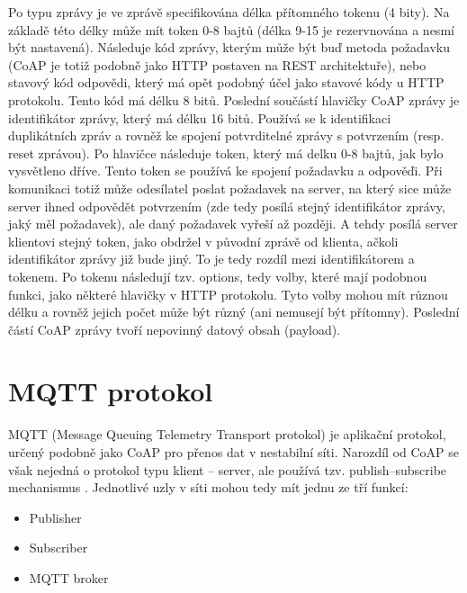 Po typu zprávy je ve zprávě specifikována délka přítomného tokenu (4 bity). Na základě této délky může mít token 0-8 bajtů (délka 9-15 je rezervnována a nesmí být nastavená). Následuje kód zprávy, kterým může být buď metoda požadavku (CoAP je totiž podobně jako HTTP postaven na REST \cite{CoAPCongestionControl2} architektuře), nebo stavový kód odpovědi, který má opět podobný účel jako stavové kódy u HTTP protokolu. Tento kód má délku 8 bitů. Poslední součástí hlavičky CoAP zprávy je identifikátor zprávy, který má délku 16 bitů. Používá se k identifikaci duplikátních zpráv a rovněž ke spojení potvrditelné zprávy s potvrzením (resp. reset zprávou). 
Po hlavičce následuje token, který má delku 0-8 bajtů, jak bylo vysvětleno dříve. Tento token se používá ke spojení požadavku a odpověďi. Při komunikaci totiž může odesílatel poslat požadavek na server, na který sice může server ihned odpovědět potvrzením (zde tedy posílá stejný identifikátor zprávy, jaký měl požadavek), ale daný požadavek vyřeší až později. A tehdy posílá server klientovi stejný token, jako obdržel v původní zprávě od klienta, ačkoli identifikátor zprávy již bude jiný. To je tedy rozdíl mezi identifikátorem a tokenem.
Po tokenu následují tzv. options, tedy volby, které mají podobnou funkci, jako některé hlavičky v HTTP protokolu. Tyto volby mohou mít různou délku a rovněž jejich počet může být různý (ani nemusejí být přítomny).
Poslední částí CoAP zprávy tvoří nepovinný datový obsah (payload).

\section{MQTT protokol}
MQTT (Message Queuing Telemetry Transport protokol) je aplikační protokol, určený podobně jako CoAP pro přenos dat v nestabilní síti. Narozdíl od CoAP se však nejedná o protokol typu klient -- server, ale používá tzv. publish--subscribe mechanismus \cite{AutomaMQTT}. Jednotlivé uzly v síti mohou tedy mít jednu ze tří funkcí:
\begin{itemize}
    \item Publisher
    \item Subscriber
    \item MQTT broker
\end{itemize}
